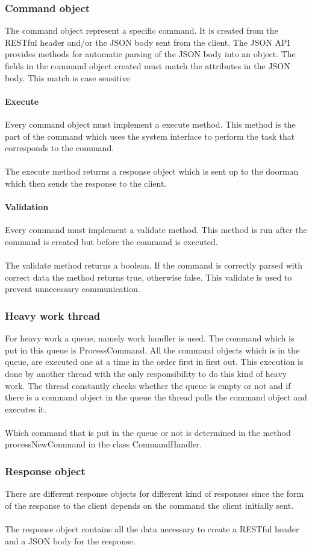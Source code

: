 \subsubsection{Command object}
The command object represent a specific command. It is created from the RESTful header and/or the JSON body sent from the client. The JSON API provides methods for automatic parsing of the JSON body into an object. The fields in the command object created must match the attributes in the JSON body. This match is case sensitive
\paragraph{Execute}
Every command object must implement a execute method. This method is the part of the command which uses the system interface to perform the task that corresponds to the command.\\
\\
The execute method returns a response object which is sent up to the doorman which then sends the response to the client. 
\paragraph{Validation}
Every command must implement a validate method. This method is run after the command is created but before the command is executed.\\
\\
The validate method returns a boolean. If the command is correctly parsed with correct data the method returns true, otherwise false. This validate is used to prevent unnecessary communication.
\subsubsection{Heavy work thread}
For heavy work a queue, namely work handler is used. The command which is put in this queue is ProcessCommand. All the command objects which is in the queue, are executed one at a time  in the order first in first out. This execution is done by another thread with the only responsibility to do this kind of heavy work. The thread constantly checks whether the queue is empty or not and if there is a command object in the queue the thread polls the command object and executes it.\\
\\
Which command that is put in the queue or not is determined in the method processNewCommand  in the class CommandHandler. 
\subsubsection{Response object}
There are different response objects for different kind of responses since the form of the response to the client depends on the command the client initially sent.\\
\\
The response object contains all the data necessary to create a RESTful header and a JSON body for the response.
